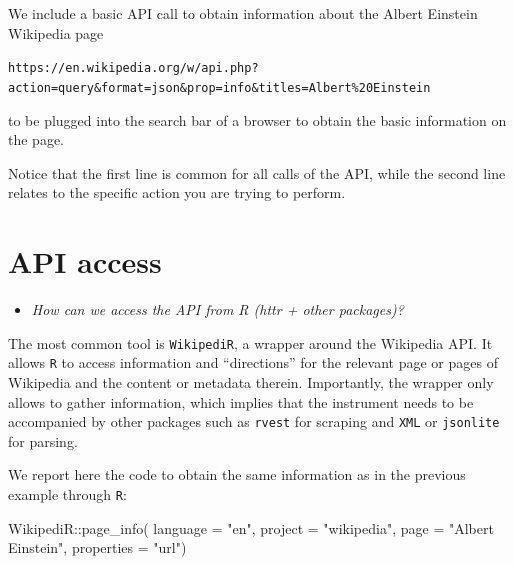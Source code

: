 \documentclass[
]{book}
\newenvironment{Shaded}{\begin{snugshade}}{\end{snugshade}}
\newcommand{\AttributeTok}[1]{\textcolor[rgb]{0.77,0.63,0.00}{#1}}
\newcommand{\FunctionTok}[1]{\textcolor[rgb]{0.00,0.00,0.00}{#1}}
\newcommand{\NormalTok}[1]{#1}
\newcommand{\SpecialCharTok}[1]{\textcolor[rgb]{0.00,0.00,0.00}{#1}}
\newcommand{\StringTok}[1]{\textcolor[rgb]{0.31,0.60,0.02}{#1}}
\providecommand{\tightlist}{%
  \setlength{\itemsep}{0pt}\setlength{\parskip}{0pt}}
\begin{document}
We include a basic API call to obtain information about the Albert Einstein Wikipedia page

\texttt{https://en.wikipedia.org/w/api.php?action=query\&format=json\&prop=info\&titles=Albert\%20Einstein}

to be plugged into the search bar of a browser to obtain the basic information on the page.

Notice that the first line is common for all calls of the API, while the second line relates to the specific action you are trying to perform.

\hypertarget{api-access-10}{%
\section{API access}\label{api-access-10}}

\begin{itemize}
\tightlist
\item
  \emph{How can we access the API from R (httr + other packages)?}
\end{itemize}

The most common tool is \texttt{WikipediR}, a wrapper around the Wikipedia API. It allows \texttt{R} to access information and ``directions'' for the relevant page or pages of Wikipedia and the content or metadata therein. Importantly, the wrapper only allows to gather information, which implies that the instrument needs to be accompanied by other packages such as \texttt{rvest} for scraping and \texttt{XML} or \texttt{jsonlite} for parsing.

We report here the code to obtain the same information as in the previous example through \texttt{R}:

\begin{Shaded}
\begin{Highlighting}[]
\NormalTok{WikipediR}\SpecialCharTok{::}\FunctionTok{page\_info}\NormalTok{(}
    \AttributeTok{language =} \StringTok{"en"}\NormalTok{, }
    \AttributeTok{project =} \StringTok{"wikipedia"}\NormalTok{, }
    \AttributeTok{page =} \StringTok{"Albert Einstein"}\NormalTok{, }
    \AttributeTok{properties =} \StringTok{"url"}\NormalTok{)}
\end{Highlighting}
\end{Shaded}
\end{document}
